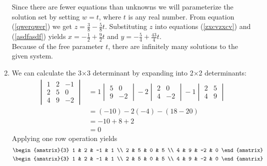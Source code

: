 \documentclass{article}
\begin{document}
\begin{enumerate}
Since there are fewer equations than unknowns we will parameterize the 
solution set by setting $w = t$, where $t$ is any real number.  From equation 
(\ref{qwerqwer}) we get $z = \frac{3}{8} - \frac{5}{8}t$.  Substituting $z$ into 
equations (\ref{zxcvzxcv}) and (\ref{asdfasdf}) yields $x = -\frac{1}{2} + 
\frac{9}{2}t$ and $y = -\frac{5}{4} + \frac{43}{4}t$. \\

Because of the free parameter $t$, there are infinitely many solutions to the given system.
\item
We can calculate the 3$\times$3 determinant by expanding into 2$\times$2 determinants:
\begin{align*}
 \begin{vmatrix}
  1 &  2 & -1 \\
  2 &  5 &  0 \\
 4 & 9 &  -2
 \end{vmatrix} &=
 1 \begin{vmatrix} 5 & 0 \\ 9 & -2 \end{vmatrix}
 -2 \begin{vmatrix} 2 & 0 \\ 4 & -2 \end{vmatrix}
 -1 \begin{vmatrix} 2 & 5 \\ 4 & 9 \end{vmatrix} \\
 &= (-10) -2 (-4) -(18 - 20) \\
 &= -10 + 8 + 2 \\
 &= 0
\end{align*}
Applying one row operation yields
\begin{align*}
 \begin{amatrix}{3}
  1 & 2 & -1  & 1 \\
  2 & 5 & 0 & 5 \\
  4 & 9 & -2 & 0 
 \end{amatrix} \\
  \begin{amatrix}{3}
  1 & 2 & -1  & 1 \\
  2 & 5 & 0 & 5 \\
  4 & 9 & -2 & 0 
 \end{amatrix}
 \end{align*}
 
\EEN


\end{enumerate}
\end{document}
